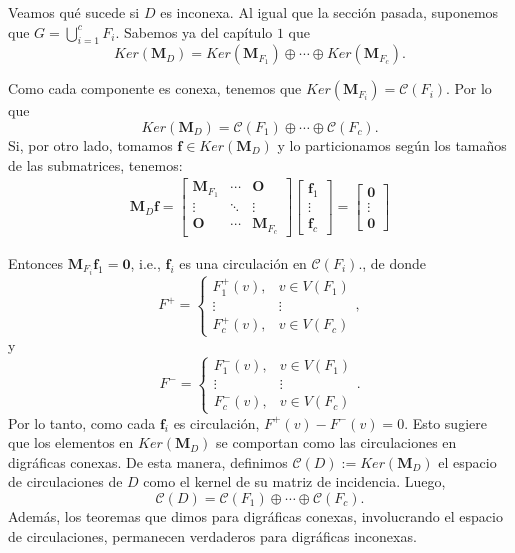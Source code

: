Veamos qué sucede si $D$ es inconexa. Al igual que la sección pasada, suponemos que $G =  \bigcup_{i=1}^{c}F_{i}$. Sabemos ya del capítulo $1$ que 
$$
Ker(\mathbf{M}_{D}) = Ker(\mathbf{M}_{F_{1}}) \oplus \cdots \oplus Ker(\mathbf{M}_{F_{c}}).
$$

Como cada componente es conexa, tenemos que $Ker(\mathbf{M}_{F_{i}}) = \mathcal{C}(F_{i})$. Por lo que $$Ker(\mathbf{M}_{D}) = \mathcal{C}(F_{1}) \oplus \cdots \oplus \mathcal{C}(F_{c}).$$ Si, por otro lado, tomamos $\mathbf{f} \in Ker(\mathbf{M}_{D})$ y lo particionamos según los tamaños de las submatrices, tenemos:
\begin{align*}
    \mathbf{M}_{D}\mathbf{f} = \begin{bmatrix}
\mathbf{M}_{F_{1}} & \cdots  & \mathbf{O} \\ 
\vdots & \ddots  & \vdots \\ 
\mathbf{O} & \cdots & \mathbf{M}_{F_{c}}
\end{bmatrix} \begin{bmatrix}
\mathbf{f}_{1}\\
\vdots\\ 
\mathbf{f}_{c}
\end{bmatrix} = \begin{bmatrix}
\mathbf{0}\\
\vdots\\ 
\mathbf{0}
\end{bmatrix}
\end{align*}

Entonces $\mathbf{M}_{F_{i}}\mathbf{f}_{1} = \mathbf{0}$, i.e., $\mathbf{f}_{i}$ es una circulación en $\mathcal{C}(F_{i})$., de donde 
$$
F^{+} = \left\{\begin{matrix}
F^{+}_{1}(v), & v \in V(F_{1}) \\
\vdots & \vdots \\
F^{+}_{c}(v), & v \in V(F_{c})    
\end{matrix}\right.,
$$
y
$$
F^{-} = \left\{\begin{matrix}
F^{-}_{1}(v), & v \in V(F_{1}) \\
\vdots & \vdots \\
F^{-}_{c}(v), & v \in V(F_{c})    
\end{matrix}\right..
$$
Por lo tanto, como cada $\mathbf{f}_{i}$ es circulación, $F^{+}(v) - F^{-}(v) = 0$. Esto sugiere que los elementos en $Ker(\mathbf{M}_{D})$ se comportan como las circulaciones en digráficas conexas. De esta manera, definimos $\mathcal{C}(D) := Ker(\mathbf{M}_{D})$ el espacio de circulaciones de $D$ como el kernel de su matriz de incidencia. Luego, $$\mathcal{C}(D) = \mathcal{C}(F_{1}) \oplus \cdots \oplus \mathcal{C}(F_{c}).$$ Además, los teoremas que dimos para digráficas conexas, involucrando el espacio de circulaciones, permanecen verdaderos para digráficas inconexas.

